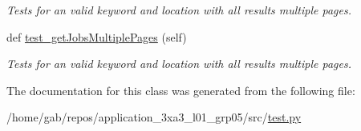 \begin{DoxyCompactItemize}
\begin{DoxyCompactList}\small\item\em Tests for an valid keyword and location with all results multiple pages. \end{DoxyCompactList}\item 
\mbox{\label{classtest_1_1indeedTest_a59349fc37896b800dae7ea2847a27ea2}} 
def \hyperlink{classtest_1_1indeedTest_a59349fc37896b800dae7ea2847a27ea2}{test\+\_\+get\+Jobs\+Multiple\+Pages} (self)
\begin{DoxyCompactList}\small\item\em Tests for an valid keyword and location with all results multiple pages. \end{DoxyCompactList}\end{DoxyCompactItemize}


The documentation for this class was generated from the following file\+:\begin{DoxyCompactItemize}
\item 
/home/gab/repos/application\+\_\+3xa3\+\_\+l01\+\_\+grp05/src/\hyperlink{test_8py}{test.\+py}\end{DoxyCompactItemize}
